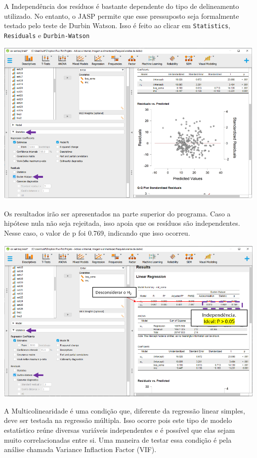 \documentclass[
]{book}
\begin{document}
A Independência dos resíduos é bastante dependente do tipo de delineamento utilizado. No entanto, o JASP permite que esse pressuposto seja formalmente testado pelo teste de Durbin Watson. Isso é feito ao clicar em \texttt{Statistics}, \texttt{Residuals} e \texttt{Durbin-Watson}

\includegraphics{./img/cap_reg_multipla_ind_residuos.png}

Os resultados irão ser apresentados na parte superior do programa. Caso a hipótese nula não seja rejeitada, isso apoia que os resíduos são independentes. Nesse caso, o valor de p foi 0.769, indicando que isso ocorreu.

\includegraphics{./img/cap_reg_multipla_ind_residuos2.png}

A Multicolinearidade é uma condição que, diferente da regressão linear simples, deve ser testada na regressão múltipla. Isso ocorre pois este tipo de modelo estatístico reúne diversas variáveis independentes e é possível que elas sejam muito correlacionadas entre si. Uma maneira de testar essa condição é pela análise chamada Variance Inflaction Factor (VIF).
\end{document}
